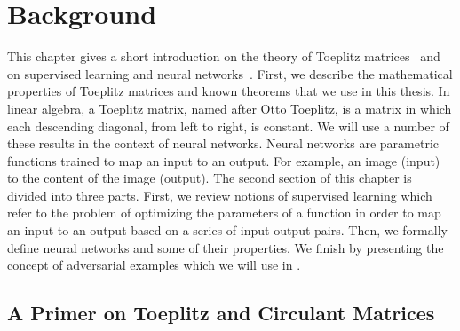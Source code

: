 \chapter{Background}
\label{chapter:ch2-background}
\localtoc


\vspace{\fill}

This chapter gives a short introduction on the theory of Toeplitz matrices~\cite{gray2006toeplitz} and on supervised learning and neural networks~\cite{shalev2014understanding}.
First, we describe the mathematical properties of Toeplitz matrices and known theorems that we use in this thesis. 
In linear algebra, a Toeplitz matrix, named after Otto Toeplitz, is a matrix in which each descending diagonal, from left to right, is constant.
We will use a number of these results in the context of neural networks.
Neural networks are parametric functions trained to map an input to an output.
For example, an image (input) to the content of the image (output).
The second section of this chapter is divided into three parts.
First, we review notions of supervised learning which refer to the problem of optimizing the parameters of a function in order to map an input to an output based on a series of input-output pairs.
Then, we formally define neural networks and some of their properties.
We finish by presenting the concept of adversarial examples which we will use in .

\vspace{\fill}



\section{A Primer on Toeplitz and Circulant Matrices}
\label{section:ch2-a_primer_on_toeplitz_and_circulant_matrices}



